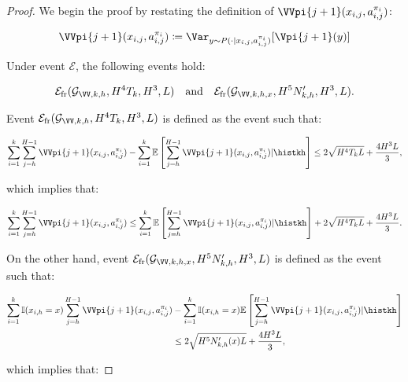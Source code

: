 \begin{proof}
We begin the proof by restating the definition of $\VVpi{j+1} (x_{i,j}, a_{i,j}^{\pi_i})$:

\begin{equation*}
    \VVpi{j+1} (x_{i,j}, a_{i,j}^{\pi_i}) \coloneqq \Var_{y \sim P(\cdot | x_{i,j}, a_{i,j}^{\pi_i})}[\Vpi{j+1} (y)]
\end{equation*}

Under event $\mathcal{E}$, the following events hold:

\begin{equation*}
    \mathcal{E}_{\mathrm{fr}} (\mathcal{G}_{\VV, k, h}, H^4 T_k, H^3, L) \quad\text{and}\quad \mathcal{E}_{\mathrm{fr}} (\mathcal{G}_{\VV, k, h, x}, H^5 N'_{k,h}, H^3, L).
\end{equation*}

Event $\mathcal{E}_{\mathrm{fr}} (\mathcal{G}_{\VV, k, h}, H^4 T_k, H^3, L)$ is defined as the event such that:

\begin{equation}
    \sum_{i=1}^k \sum_{j=h}^{H-1} \VVpi{j+1} (x_{i,j}, a_{i,j}^{\pi_i}) - \sum_{i=1}^k \mathbb{E} \left[ \sum_{j=h}^{H-1} \VVpi{j+1} (x_{i,j}, a_{i,j}^{\pi_i}) | \histkh \right] \le 2\sqrt{H^4 T_k L} + \frac{4H^3 L}{3}, \nonumber
\end{equation}

which implies that:

\begin{equation}
    \sum_{i=1}^k \sum_{j=h}^{H-1} \VVpi{j+1} (x_{i,j}, a_{i,j}^{\pi_i}) \le \sum_{i=1}^k \mathbb{E} \left[ \sum_{j=h}^{H-1} \VVpi{j+1} (x_{i,j}, a_{i,j}^{\pi_i}) | \histkh \right] + 2\sqrt{H^4 T_k L} + \frac{4H^3 L}{3}. \label{lem:sum_next_state_var:1}
\end{equation}

On the other hand, event $\mathcal{E}_{\mathrm{fr}} (\mathcal{G}_{\VV, k, h, x}, H^5 N'_{k,h}, H^3, L)$ is defined as the event such that:

\begin{align}
    \sum_{i=1}^k \mathbb{I}(x_{i,h}=x) \sum_{j=h}^{H-1} \VVpi{j+1} (x_{i,j}, a_{i,j}^{\pi_i}) &- \sum_{i=1}^k \mathbb{I}(x_{i,h}=x) \mathbb{E} \left[ \sum_{j=h}^{H-1} \VVpi{j+1} (x_{i,j}, a_{i,j}^{\pi_i}) | \histkh \right] \nonumber \\ 
    &\le 2\sqrt{H^5 N'_{k,h}(x) L} + \frac{4H^3 L}{3}, \nonumber
\end{align}

which implies that:


\end{proof}
